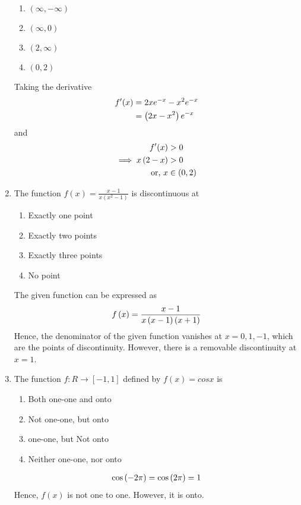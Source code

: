 \documentclass[journal,12pt,twocolumn]{IEEEtran}
\renewcommand\thesection{\arabic{section}}
\begin{document}
\begin{enumerate}[label=\thesection.\arabic*.,ref=\thesection.\theenumi]
\begin{enumerate}
    \item $\left(\infty , -\infty \right)$
    \item $\left(\infty , 0 \right)$
    \item $\left(2 , \infty \right)$
    \item $\left(0 , 2 \right)$
\end{enumerate}
\solution Taking the derivative
		\begin{align}
			f^{\prime}(x) &= 2xe^{-x} -x^2 e^{-x} 
\\
			&= \left(2x - x^2\right)e^{-x}
		\end{align}
		and 
		\begin{align}
			f^{\prime}(x) &> 0
			\\
			\implies x\left(2 - x\right) &> 0
			\\
			\text{or, } x &\in \left(0,2\right)
		\end{align}
\item The function $ f\left({x} \right) = \frac{x-1}{x\left(x^2 -1 \right)} $ is discontinuous at

\begin{enumerate}
    \item Exactly one point
    \item Exactly two points
    \item Exactly three points
    \item No point
\end{enumerate}
\solution The given function can be expressed as
		\begin{align}
			f\left(x\right) = \frac{x-1}{x\left(x-1\right)\left(x+1\right)} 
		\end{align}
Hence, the denominator of the given function vanishes at $x = 0, 1, -1$,    
which are the points of discontinuity.  However, there is a removable discontinuity at $x = 1$.
\item The function  $ f : R \rightarrow \left[-1,1 \right] $ defined by $ f\left(x \right) = cosx $ is

\begin{enumerate}
    \item Both one-one and onto
    \item Not one-one, but onto
    \item one-one, but Not onto
    \item Neither one-one, nor onto
\end{enumerate}
\solution 
		\begin{align}
			\cos\left(-2\pi\right)
			=
			\cos\left(2\pi\right) = 1
		\end{align}
		Hence, $f(x)$ is not one to one.  However, it  is onto.





\end{enumerate}
\end{document}
